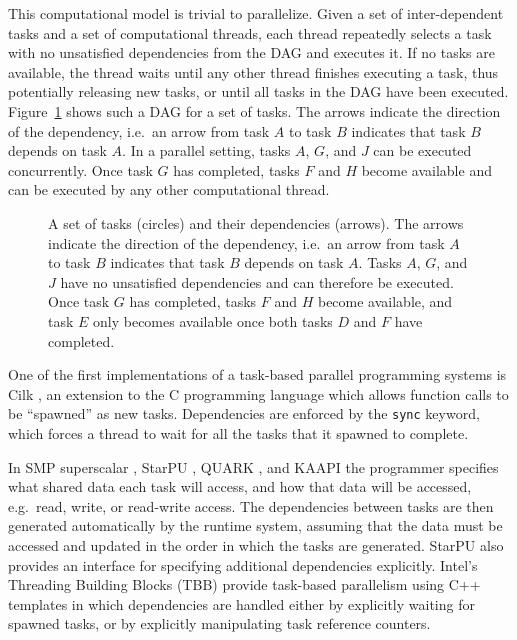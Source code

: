 \documentclass[preprint]{elsarticle}
\newcommand{\fig}[1]
    {Figure~\ref{fig:#1}}
\begin{document}
This computational model is trivial to parallelize.
Given a set of inter-dependent tasks and a set of computational
threads, each thread repeatedly selects a task with no
unsatisfied dependencies from the DAG and executes it.
If no tasks are available, the thread waits until any other
thread finishes executing a task, thus potentially releasing
new tasks, or until all tasks in the DAG have been executed.
\fig{Tasks} shows such a DAG for a set of tasks.
The arrows indicate the direction of the dependency, i.e.~an
arrow from task $A$ to task $B$ indicates that task $B$ depends
on task $A$.
In a parallel setting, tasks $A$, $G$, and $J$ can be
executed concurrently.
Once task $G$ has completed, tasks $F$ and $H$ become available
and can be executed by any other computational thread.

\begin{figure}
    \centerline{}
    \caption{A set of tasks (circles) and their dependencies (arrows).
        The arrows indicate the direction of the dependency, i.e.~an
        arrow from task $A$ to task $B$ indicates that task $B$ depends
        on task $A$.
        Tasks $A$, $G$, and $J$ have no unsatisfied dependencies and
        can therefore be executed.
        Once task $G$ has completed, tasks $F$ and $H$ become available,
        and task $E$ only becomes available once both tasks $D$ and $F$
        have completed.}
    \label{fig:Tasks}
\end{figure}

One of the first implementations of a task-based parallel programming
systems is Cilk \cite{ref:Blumofe1995}, an extension to the C
programming language which allows function calls to be ``spawned''
as new tasks.
Dependencies are enforced by the {\tt sync} keyword, which
forces a thread to wait for all the tasks that it spawned
to complete.

In SMP superscalar \cite{ref:Perez2008}, StarPU \cite{ref:Augonnet2011},
QUARK \cite{ref:Yarkhan2011}, and KAAPI \cite{ref:Gautier2007}
the programmer specifies
what shared data each task will access, and how that data will
be accessed, e.g.~read, write, or read-write access.
The dependencies between tasks are then generated
automatically by the runtime system, assuming that the
data must be accessed and updated in the order in which
the tasks are generated.
StarPU also provides an interface for specifying additional
dependencies explicitly.
Intel's Threading Building Blocks (TBB)
\cite{ref:Reinders2010}
provide task-based parallelism using C++ templates in which
dependencies are handled either by explicitly waiting
for spawned tasks, or by explicitly manipulating
task reference counters.
\end{document}

